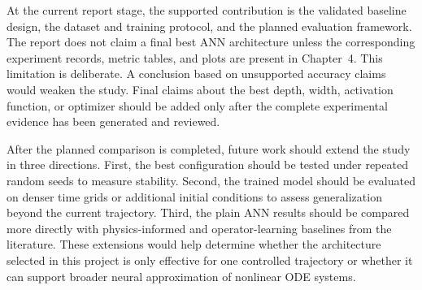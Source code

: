 At the current report stage, the supported contribution is the validated baseline design, the dataset and training protocol, and the planned evaluation framework. The report does not claim a final best ANN architecture unless the corresponding experiment records, metric tables, and plots are present in Chapter~4. This limitation is deliberate. A conclusion based on unsupported accuracy claims would weaken the study. Final claims about the best depth, width, activation function, or optimizer should be added only after the complete experimental evidence has been generated and reviewed.

After the planned comparison is completed, future work should extend the study in three directions. First, the best configuration should be tested under repeated random seeds to measure stability. Second, the trained model should be evaluated on denser time grids or additional initial conditions to assess generalization beyond the current trajectory. Third, the plain ANN results should be compared more directly with physics-informed and operator-learning baselines from the literature. These extensions would help determine whether the architecture selected in this project is only effective for one controlled trajectory or whether it can support broader neural approximation of nonlinear ODE systems.
